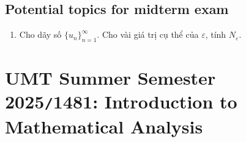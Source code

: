 \documentclass{article}
\begin{document}
\subsection{Potential topics for midterm exam}

\begin{enumerate}
	\item Cho dãy số $\{u_n\}_{n=1}^\infty$. Cho vài giá trị cụ thể của $\varepsilon$, tính $N_\varepsilon$.
\end{enumerate}


\section{UMT Summer Semester 2025{\tt/}1481: Introduction to Mathematical Analysis}
\end{document}
